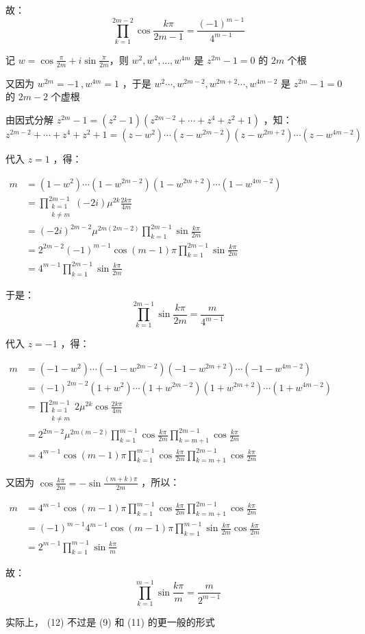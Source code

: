 故： \begin{equation}
\prod_{k=1}^{2m-2}\cos\frac{k\pi}{2m-1}=\frac{(-1)^{m-1}}{4^{m-1}}\tag{10} 
\end{equation}

记 $\displaystyle{w=\cos\frac{\pi}{2m}+i\sin\frac{\pi}{2m}}$，则 $w^2,w^4,\dots ,w^{4m}$ 是 $z^{2m}-1=0$ 的 $2m$ 个根

又因为 $w^{2m}=-1\,,w^{4m}=1$ ，于是 $w^2\cdots,w^{2m-2},w^{2m+2}\cdots,w^{4m-2}$ 是 $z^{2m}-1=0$ 的 $2m-2$ 个虚根

由因式分解 $z^{2m}-1=(z^2-1)(z^{2m-2}+\cdots+z^4+z^2+1)$ ，知：
$$z^{2m-2}+\cdots+z^4+z^2+1=(z-w^2)\cdots(z-w^{2m-2})(z-w^{2m+2})\cdots(z-w^{4m-2})$$

代入 $z=1$ ，得：

$\begin{eqnarray*} m&=(1-w^2)\cdots(1-w^{2m-2})(1-w^{2m+2})\cdots(1-w^{4m-2})\\ &=\prod_{\substack{k=1\\k\neq m}}^{2m-1}(-2i)\mu^{2k}\frac{2k\pi}{4m}\\ &=(-2i)^{2m-2}\mu^{2m(2m-2)}\prod_{k=1}^{2m-1}\sin\frac{k\pi}{2m}\\ &=2^{2m-2}(-1)^{m-1}\cos(m-1)\pi\prod_{k=1}^{2m-1}\sin\frac{k\pi}{2m}\\ &=4^{m-1}\prod_{k=1}^{2m-1}\sin\frac{k\pi}{2m} \end{eqnarray*}$

于是： \begin{equation}
\prod_{k=1}^{2m-1}\sin\frac{k\pi}{2m}=\frac{m}{4^{m-1}}\tag{11} 
\end{equation}

代入 $z=-1$ ，得：

$\begin{eqnarray*} m&=(-1-w^2)\cdots(-1-w^{2m-2})(-1-w^{2m+2})\cdots(-1-w^{4m-2})\\ &=(-1)^{2m-2}(1+w^2)\cdots(1+w^{2m-2})(1+w^{2m+2})\cdots(1+w^{4m-2})\\ &=\prod_{\substack{k=1\\k\neq m}}^{2m-1}2\mu^{2k}\cos\frac{2k\pi}{4m}\\ &=2^{2m-2}\mu^{2m(m-2)}\prod_{k=1}^{m-1}\cos\frac{k\pi}{2m}\prod_{k=m+1}^{2m-1}\cos\frac{k\pi}{2m}\\ &=4^{m-1}\cos(m-1)\pi\prod_{k=1}^{m-1}\cos\frac{k\pi}{2m}\prod_{k=m+1}^{2m-1}\cos\frac{k\pi}{2m}  \end{eqnarray*}$

又因为 $\displaystyle{\cos\frac{k\pi}{2m}=-\sin\frac{(m+k)\pi}{2m}}$ ，所以：

$\begin{eqnarray*} m&=4^{m-1}\cos(m-1)\pi\prod_{k=1}^{m-1}\cos\frac{k\pi}{2m}\prod_{k=m+1}^{2m-1}\cos\frac{k\pi}{2m}\\ &=(-1)^{m-1}4^{m-1}\cos(m-1)\pi\prod_{k=1}^{m-1}\sin\frac{k\pi}{2m}\cos\frac{k\pi}{2m}\\ &=2^{m-1}\prod_{k=1}^{m-1}\sin\frac{k\pi}{m} \end{eqnarray*}$

故： \begin{equation}
\prod_{k=1}^{m-1}\sin\frac{k\pi}{m}=\frac{m}{2^{m-1}}\tag{12}
\end{equation}

实际上， (12) 不过是 (9) 和 (11) 的更一般的形式

